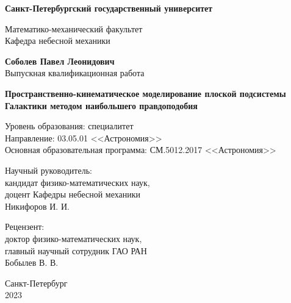 \documentclass[a4paper, oneside, 14pt]{article}
\newcommand{\npar}{\par\vspace{\baselineskip}}
\begin{document}
\begin{titlepage}
  \begin{center}
    {
      \Large
      \textbf{Санкт-Петербургский государственный университет}

      Математико-механический факультет\\
      Кафедра небесной механики\par
    }

    \vfill

    {
      \Large
      \textbf{Соболев Павел Леонидович}\\
      Выпускная квалификационная работа\par
    }

    \vspace{0.5cm}

    {
      \LARGE
      \textbf{Пространственно-кинематическое моделирование плоской подсистемы Галактики методом наибольшего правдоподобия}\par
    }

    \vspace{0.5cm}

    {
      \Large

      Уровень образования: специалитет\\
      Направление: 03.05.01 <<Астрономия>>\\
      Основная образовательная программа: СМ.5012.2017 <<Астрономия>>\par
    }

    \vfill

    \begin{flushright}
      \large

      Научный руководитель:\\
      кандидат физико-математических наук,\\
      доцент Кафедры небесной механики\\
      Никифоров И. И.\npar

      Рецензент:\\
      доктор физико-математических наук,\\
      главный научный сотрудник ГАО РАН\\
      Бобылев В. В.\par

    \end{flushright}

    \vfill

    {
      \Large
      Санкт-Петербург\\
      2023\par
    }
  \end{center}
\end{titlepage}
\end{document}
